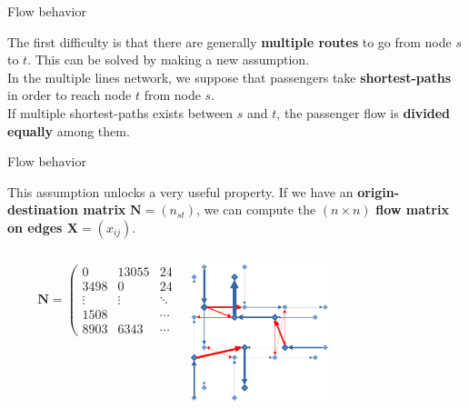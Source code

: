 \documentclass[10pt]{beamer}
\newcommand{\imp}[1]{\textbf{\color{cyan}#1}}
\begin{document}
	
	
	\begin{frame}{Flow behavior}
		
		The first difficulty is that there are generally \imp{multiple routes} to go from node $s$ to $t$. This can be solved by making a new assumption. \\
		\vspace{0.4cm}
		In the multiple lines network, we suppose that passengers take \imp{shortest-paths} in order to reach node $t$ from node $s$. \\
		\vspace{0.4cm}
		If multiple shortest-paths exists between $s$ and $t$, the passenger flow is \imp{divided equally} among them.
		
	\end{frame}
	
	
	\begin{frame}{Flow behavior}
		
		This assumption unlocks a very useful property. If we have an \imp{origin-destination matrix} $\mathbf{N} = (n_{st})$, we can compute the $(n \times n)$ \imp{flow matrix on edges $\mathbf{X} = (x_{ij})$}. \\
		\vspace{0.6cm}
		\begin{columns}
			\small
			\begin{column}{0.7\textwidth}
				$$
				\hspace{1cm} \mathbf{N} = \left( \begin{array}{ccccc}
				0 & 13055 & 243 & \cdots & 144 \\
				3498 & 0 & 24429 & \cdots & 7523 \\
				\vdots & \vdots & \ddots & \ddots & \vdots \\
				1508 &  & \cdots & 0 & 5093 \\
				8903 & 6343 & \cdots & 53 & 0 
				\end{array} \right) \rightarrow 
				$$ 
			\end{column}
			\begin{column}{0.6\textwidth}
				\hspace{0.5cm} \includegraphics[width=0.5\textwidth]{img/flow_computed.png}
			\end{column}
		\end{columns}
	\end{frame}
	
\end{document}
